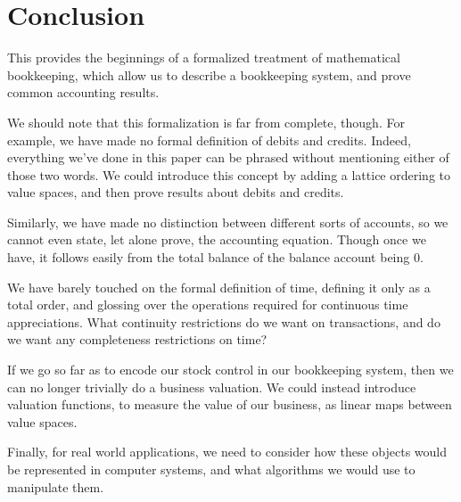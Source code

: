 \section{Conclusion}

This provides the beginnings of a formalized treatment of mathematical bookkeeping,
which allow us to describe a bookkeeping system, and prove common accounting results.

We should note that this formalization is far from complete, though.
For example, we have made no formal definition of debits and credits.
Indeed, everything we've done in this paper can be phrased without mentioning either of those two words.
We could introduce this concept by adding a lattice ordering to value spaces, and then prove results about debits and credits.

Similarly, we have made no distinction between different sorts of accounts,
so we cannot even state, let alone prove, the accounting equation.
Though once we have, it follows easily from the total balance of the balance account being $0$.

We have barely touched on the formal definition of time, defining it only as a total order,
and glossing over the operations required for continuous time appreciations.
What continuity restrictions do we want on transactions, and do we want any completeness restrictions on time?

If we go so far as to encode our stock control in our bookkeeping system,
then we can no longer trivially do a business valuation.
We could instead introduce valuation functions, to measure the value of our business, as linear maps between value spaces.

Finally, for real world applications, we need to consider how these objects would be represented in computer systems,
and what algorithms we would use to manipulate them.
